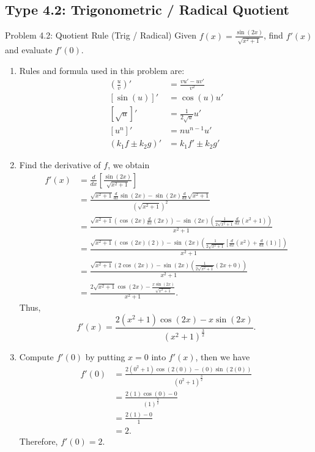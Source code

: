 \documentclass[11pt,a4paper]{article}
\begin{document}
\subsection{Type 4.2: Trigonometric / Radical Quotient}
\begin{problembox}{Problem 4.2: Quotient Rule (Trig / Radical)}
Given $f(x) = \frac{\sin(2x)}{\sqrt{x^2 + 1}}$, find $f'(x)$ and evaluate $f'(0)$.
\end{problembox}
\begin{solutionbox}
\begin{enumerate}
	\item [Step 1.] Rules and formula used in this problem are:
	\begin{align*}
		\left(\frac{u}{v}\right)' &= \frac{v u' - u v'}{v^2} \\
		[\sin(u)]' &= \cos(u) u' \\
		[\sqrt{u}]' &= \frac{1}{2\sqrt{u}} u' \\
		[u^n]' &= n u^{n-1} u' \\
		(k_1f \pm k_2 g)' &= k_1f' \pm k_2g'
	\end{align*}
	
	\item [Step 2.] Find the derivative of $f$, we obtain
	\begin{align*}
		f'(x) &= \frac{d}{dx} \left[ \frac{\sin(2x)}{\sqrt{x^2 + 1}} \right] \\
		&= \frac{\sqrt{x^2 + 1} \frac{d}{dx}\sin(2x) - \sin(2x) \frac{d}{dx}\sqrt{x^2 + 1}}{(\sqrt{x^2 + 1})^2} \\
		&= \frac{\sqrt{x^2 + 1} \left(\cos(2x)\frac{d}{dx}(2x)\right) - \sin(2x) \left(\frac{1}{2\sqrt{x^2+1}}\frac{d}{dx}(x^2+1)\right)}{x^2 + 1} \\
		&= \frac{\sqrt{x^2 + 1} \left(\cos(2x)(2)\right) - \sin(2x) \left(\frac{1}{2\sqrt{x^2+1}} \left[ \frac{d}{dx}(x^2) + \frac{d}{dx}(1) \right] \right)}{x^2 + 1} \\
		&= \frac{\sqrt{x^2 + 1} (2\cos(2x)) - \sin(2x) \left(\frac{1}{2\sqrt{x^2+1}} (2x + 0)\right)}{x^2 + 1} \\
		&= \frac{2\sqrt{x^2 + 1}\cos(2x) - \frac{x\sin(2x)}{\sqrt{x^2+1}}}{x^2 + 1}.
	\end{align*}
	Thus,
	\begin{equation*}
		f'(x) = \frac{2(x^2+1)\cos(2x) - x\sin(2x)}{(x^2+1)^{\frac{3}{2}}}.
	\end{equation*}
	
	\item [Step 3.] Compute $f'(0)$ by putting $x = 0$ into $f'(x)$, then we have
	\begin{align*}
		f'(0) &= \frac{2(0^2+1)\cos(2(0)) - (0)\sin(2(0))}{(0^2+1)^{\frac{3}{2}}} \\
		&= \frac{2(1)\cos(0) - 0}{(1)^{\frac{3}{2}}} \\
		&= \frac{2(1) - 0}{1} \\
		&= 2.
	\end{align*}
	Therefore, $f'(0) = 2$.
\end{enumerate}
\end{solutionbox}
\end{document}
